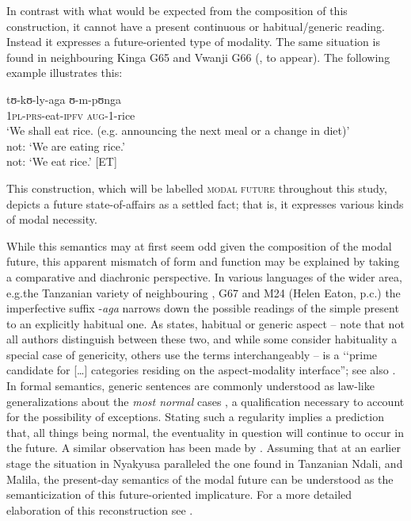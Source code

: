 In contrast with what would be expected from the composition of this construction, it cannot have a present continuous or habitual/generic reading. Instead it expresses a future-oriented type of modality. The same situation is found in neighbouring Kinga G65 and Vwanji G66 (\citeauthor{EatonHToAppear}, to appear). The following example illustrates this:

\begin{exe}
\ex \label{exCOMMEinstiegsbeispiel}
\gll tʊ-kʊ-ly-aga ʊ-m-pʊnga\\
\textsc{1pl}-\textsc{prs}-eat-\textsc{ipfv} \textsc{aug}-1-rice\\
\glt `We shall eat rice. (e.g. announcing the next meal or a change in diet)'\\
not: `We are eating rice.'\\
not: `We eat rice.' [ET]
\end{exe}

This construction, which will be labelled \textsc{modal future} throughout this study, depicts a future state-of-affairs as a settled fact; that is, it expresses various kinds of modal necessity.

While this semantics may at first seem odd given the composition of the modal future, this apparent mismatch of form and function may be explained by taking a comparative and diachronic perspective. In various languages of the wider area, e.g.the Tanzanian variety of neighbouring  \citep{SwillaI1998},  G67 \citep{GrayMS} and  M24 (Helen Eaton, p.c.) the imperfective suffix \mbox{-\textit{aga}} narrows down the possible readings of the simple present to an explicitly habitual one. As \citet[21]{ZiegelerD2006} states, habitual or generic aspect -- note that not all authors distinguish between these two, and while some consider habituality a special case of genericity, others use the terms interchangeably -- is a \lq\lq prime candidate for [\ldots] categories residing on the aspect-modality interface''; see also \citet{GivonT1994}. In formal semantics, generic sentences are commonly understood as law-like generalizations about the \textit{most normal} cases \citep{KrifkaMetal1995}, a qualification necessary to account for the possibility of exceptions. Stating such a regularity implies a prediction that, all things being normal, the eventuality in question will continue to occur in the future. A similar observation has been made by \citet[140f]{BrintonL1988}. Assuming that at an earlier stage the situation in Nyakyusa paralleled the one found in Tanzanian Ndali,  and Malila, the present-day semantics of the modal future can be understood as the semanticization of this future-oriented implicature. For a more detailed elaboration of this reconstruction see \citet{PersohnB2016}.

